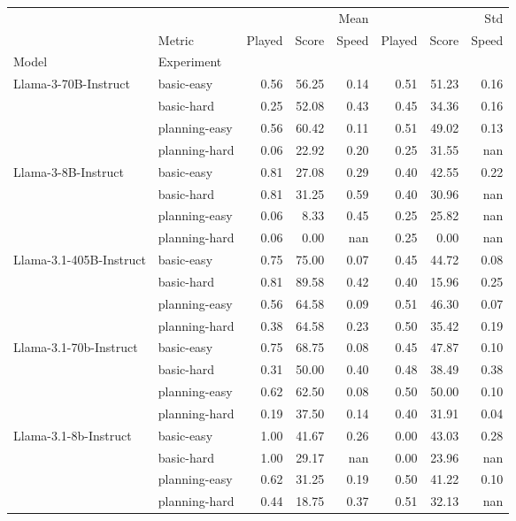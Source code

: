 \begin{tabular}{llrrrrrr}
\hline
 &  & \multicolumn{3}{r}{Mean} & \multicolumn{3}{r}{Std} \\
 & Metric & Played & Score & Speed & Played & Score & Speed \\
Model & Experiment &  &  &  &  &  &  \\
\multirow[c]{4}{*}{Llama-3-70B-Instruct} & basic-easy & 0.56 & 56.25 & 0.14 & 0.51 & 51.23 & 0.16 \\
 & basic-hard & 0.25 & 52.08 & 0.43 & 0.45 & 34.36 & 0.16 \\
 & planning-easy & 0.56 & 60.42 & 0.11 & 0.51 & 49.02 & 0.13 \\
 & planning-hard & 0.06 & 22.92 & 0.20 & 0.25 & 31.55 & nan \\
\cline{1-8}
\multirow[c]{4}{*}{Llama-3-8B-Instruct} & basic-easy & 0.81 & 27.08 & 0.29 & 0.40 & 42.55 & 0.22 \\
 & basic-hard & 0.81 & 31.25 & 0.59 & 0.40 & 30.96 & nan \\
 & planning-easy & 0.06 & 8.33 & 0.45 & 0.25 & 25.82 & nan \\
 & planning-hard & 0.06 & 0.00 & nan & 0.25 & 0.00 & nan \\
\cline{1-8}
\multirow[c]{4}{*}{Llama-3.1-405B-Instruct} & basic-easy & 0.75 & 75.00 & 0.07 & 0.45 & 44.72 & 0.08 \\
 & basic-hard & 0.81 & 89.58 & 0.42 & 0.40 & 15.96 & 0.25 \\
 & planning-easy & 0.56 & 64.58 & 0.09 & 0.51 & 46.30 & 0.07 \\
 & planning-hard & 0.38 & 64.58 & 0.23 & 0.50 & 35.42 & 0.19 \\
\cline{1-8}
\multirow[c]{4}{*}{Llama-3.1-70b-Instruct} & basic-easy & 0.75 & 68.75 & 0.08 & 0.45 & 47.87 & 0.10 \\
 & basic-hard & 0.31 & 50.00 & 0.40 & 0.48 & 38.49 & 0.38 \\
 & planning-easy & 0.62 & 62.50 & 0.08 & 0.50 & 50.00 & 0.10 \\
 & planning-hard & 0.19 & 37.50 & 0.14 & 0.40 & 31.91 & 0.04 \\
\cline{1-8}
\multirow[c]{4}{*}{Llama-3.1-8b-Instruct} & basic-easy & 1.00 & 41.67 & 0.26 & 0.00 & 43.03 & 0.28 \\
 & basic-hard & 1.00 & 29.17 & nan & 0.00 & 23.96 & nan \\
 & planning-easy & 0.62 & 31.25 & 0.19 & 0.50 & 41.22 & 0.10 \\
 & planning-hard & 0.44 & 18.75 & 0.37 & 0.51 & 32.13 & nan \\

\end{tabular}
